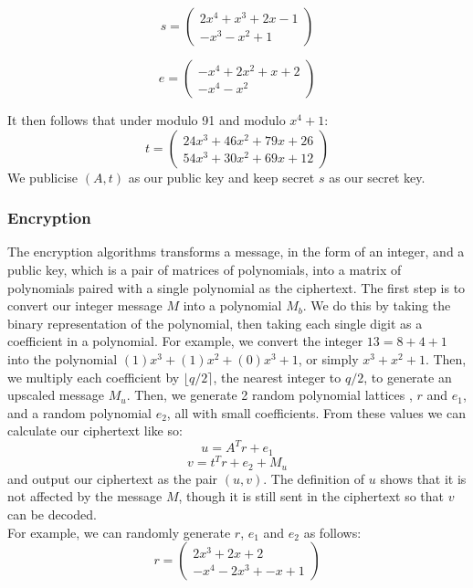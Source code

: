 \documentclass{article}
\newcommand{\round}[1]{\ensuremath{\lfloor#1\rceil}}
\begin{document}
\[ s = \begin{pmatrix}
   2x^4 + x^3 + 2x - 1 \\
   -x^3 - x^2 + 1
       \end{pmatrix}
\]

\[
   e = \begin{pmatrix}
      -x^4 + 2x^2 + x + 2 \\
      -x^4 -x^2
       \end{pmatrix}
\]

It then follows that under modulo 91 and modulo $x^4 + 1$:
\[
   t = \begin{pmatrix}
      24x^3 + 46x^2 + 79x + 26 \\
      54x^3 + 30x^2 + 69x + 12
       \end{pmatrix}
\]
We publicise $(A, t)$ as our public key and keep secret $s$ as our secret key.

\subsubsection{Encryption}
The encryption algorithms transforms a message, in the form of an integer, and a public key, which is a pair of matrices of polynomials,
into a matrix of polynomials paired with a single polynomial as the ciphertext.
\medskip
The first step is to convert our integer message $M$ into a polynomial $M_{b}$. We do this by taking the binary representation of the polynomial,
then taking each single digit as a coefficient in a polynomial. For example, we convert the integer $13 = 8 + 4 + 1$ into the polynomial
$(1)x^{3} + (1)x^{2} + (0)x^{3} + 1$, or simply $x^{3} + x^{2} + 1$.
Then, we multiply each coefficient by $\round{q/2}$, the nearest integer to $q/2$, to generate an upscaled message $M_{u}$.
Then, we generate 2 random polynomial lattices , $r$ and $e_{1}$, and a random polynomial $e_{2}$, all with small coefficients.
From these values we can calculate our ciphertext like so:
\[u = A^{T}r + e_{1}\]
\[v = t^{T}r + e_{2} + M_{u}\]
and output our ciphertext as the pair $(u, v)$. The definition of $u$ shows that it is not affected by the message $M$, though it is still
sent in the ciphertext so that $v$ can be decoded.
\\
For example, we can randomly generate $r$, $e_{1}$ and $e_{2}$ as follows:
\[
   r = \begin{pmatrix}
         2x^3 + 2x + 2 \\
         -x^4 -2x^3 + -x + 1
       \end{pmatrix}
\]
\end{document}
